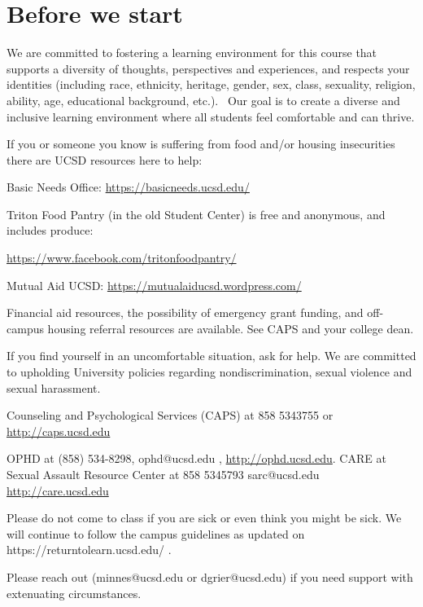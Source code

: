 

\section*{Before we start}

We are committed to fostering a learning environment for this course that supports a diversity of thoughts, 
perspectives and experiences, and respects your identities (including race, ethnicity, heritage, gender, sex, 
class, sexuality, religion, ability, age, educational background, etc.).  
Our goal is to create a diverse and inclusive learning environment where all students feel comfortable and can thrive. 

If you or someone you know is suffering from food and/or housing insecurities 
there are UCSD resources here to help:

Basic Needs Office: \href{https://basicneeds.ucsd.edu/}{https://basicneeds.ucsd.edu/}

Triton Food Pantry (in the old Student Center)
is free and anonymous, and includes produce: 

\href{https://www.facebook.com/tritonfoodpantry/}{https://www.facebook.com/tritonfoodpantry/}

Mutual Aid UCSD: \href{https://mutualaiducsd.wordpress.com/}{https://mutualaiducsd.wordpress.com/}

Financial aid resources, the possibility of emergency grant funding, and off-campus housing referral 
resources are available. See CAPS and your college dean.

If you find yourself in an uncomfortable situation, ask for help. 
We are committed to upholding University policies regarding nondiscrimination, sexual violence and sexual harassment.

Counseling and Psychological Services (CAPS) at 858 5343755 or \href{http://caps.ucsd.edu}{http://caps.ucsd.edu}


OPHD at (858) 534-8298, ophd@ucsd.edu , \href{http://ophd.ucsd.edu}{http://ophd.ucsd.edu}. 
CARE at Sexual Assault Resource Center at 858 5345793 sarc@ucsd.edu \href{http://care.ucsd.edu}{http://care.ucsd.edu}


Please do not come to class if you are sick or even think you might be sick.
We will continue to follow the campus guidelines as updated on https://returntolearn.ucsd.edu/ .

Please reach out (minnes@ucsd.edu or dgrier@ucsd.edu) if you need support with extenuating circumstances.


